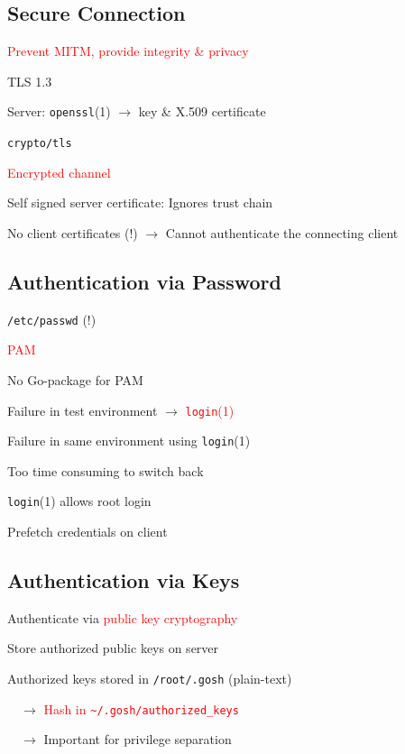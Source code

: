 \documentclass[
	xcolor=dvipsnames,
	handout
]{beamer}
\newenvironment{zhawframe}[1][]
{\begin{frame}[environment=fr,#1]{\insertsubsectionhead}{\insertsectionhead}}
{\end{frame}
}
\begin{document}
\subsection{Secure Connection}
\begin{zhawframe}
 \textcolor{red}{Prevent MITM, provide integrity \& privacy}

 TLS 1.3

 Server: \texttt{openssl}(1) $\rightarrow$ key \& X.509 certificate

 \texttt{crypto/tls}

 \textcolor{red}{Encrypted channel}

 Self signed server certificate: Ignores trust chain

 No client certificates (!) $\rightarrow$ Cannot authenticate the connecting client
\end{zhawframe}

\subsection{Authentication via Password}
\begin{zhawframe}
 \texttt{/etc/passwd} (!)

 \textcolor{red}{PAM}

 No Go-package for PAM

 Failure in test environment $\rightarrow$ \textcolor{red}{\texttt{login}(1)}

 Failure in same environment using \texttt{login}(1)

 Too time consuming to switch back

 \texttt{login}(1) allows root login

 Prefetch credentials on client
\end{zhawframe}

\subsection{Authentication via Keys}
\begin{zhawframe}
 Authenticate via \textcolor{red}{public key cryptography}

 Store authorized public keys on server

 Authorized keys stored in \texttt{/root/.gosh} (plain-text)

$\quad\rightarrow$ \textcolor{red}{Hash in \texttt{\textasciitilde{}/.gosh/authorized\_{}keys}}

$\quad\rightarrow$ Important for privilege separation
\end{zhawframe}
\end{document}
